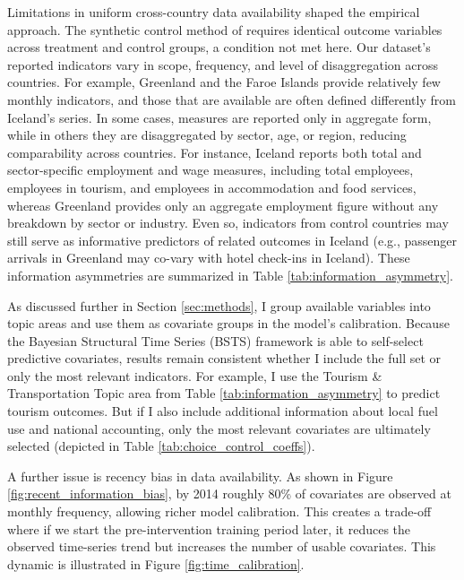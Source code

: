 \documentclass[12pt]{article}
\begin{document}
Limitations in uniform cross-country data availability shaped the empirical approach. The synthetic control method of \citet{abadie_2003_the} requires identical outcome variables across treatment and control groups, a condition not met here. Our dataset's reported indicators vary in scope, frequency, and level of disaggregation across countries. For example, Greenland and the Faroe Islands provide relatively few monthly indicators, and those that are available are often defined differently from Iceland’s series. In some cases, measures are reported only in aggregate form, while in others they are disaggregated by sector, age, or region, reducing comparability across countries. For instance, Iceland reports both total and sector-specific employment and wage measures, including total employees, employees in tourism, and employees in accommodation and food services, whereas Greenland provides only an aggregate employment figure without any breakdown by sector or industry. Even so, indicators from control countries may still serve as informative predictors of related outcomes in Iceland (e.g., passenger arrivals in Greenland may co-vary with hotel check-ins in Iceland). These information asymmetries are summarized in Table \ref{tab:information_asymmetry}.

 As discussed further in Section \ref{sec:methods}, I group available variables into topic areas and use them as covariate groups in the model’s calibration. Because the Bayesian Structural Time Series (BSTS) framework is able to self-select predictive covariates, results remain consistent whether I include the full set or only the most relevant indicators. For example, I use the Tourism \& Transportation Topic area from Table \ref{tab:information_asymmetry} to predict tourism outcomes. But if I also include additional information about local fuel use and national accounting, only the most relevant covariates are ultimately selected (depicted in Table \ref{tab:choice_control_coeffs}). 

\clearpage

\clearpage

A further issue is recency bias in data availability. As shown in Figure \ref{fig:recent_information_bias}, by 2014 roughly 80\% of covariates are observed at monthly frequency, allowing richer model calibration. This creates a trade-off where if we  start the pre-intervention training period later, it reduces the observed time-series trend but increases the number of usable covariates. This dynamic is illustrated in Figure \ref{fig:time_calibration}.  
\end{document}
